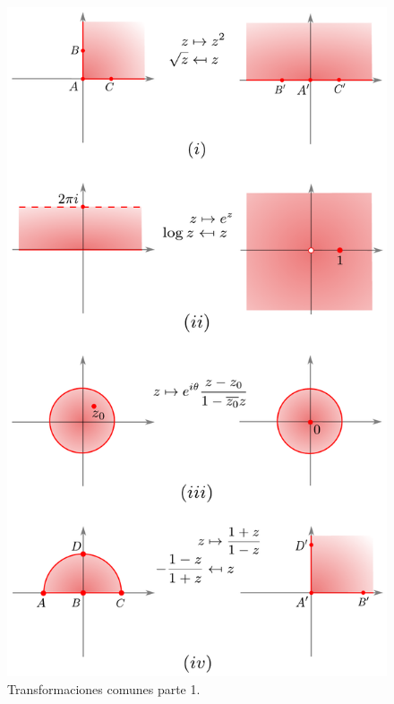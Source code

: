 \begin{figure}[H]
    \centering
    \includegraphics[scale = 0.7]{Figuras/MapeoConforme4.pdf}
    \caption{Transformaciones comunes parte 1.}
    \label{fig:EjMapeosConformes1}
\end{figure}

